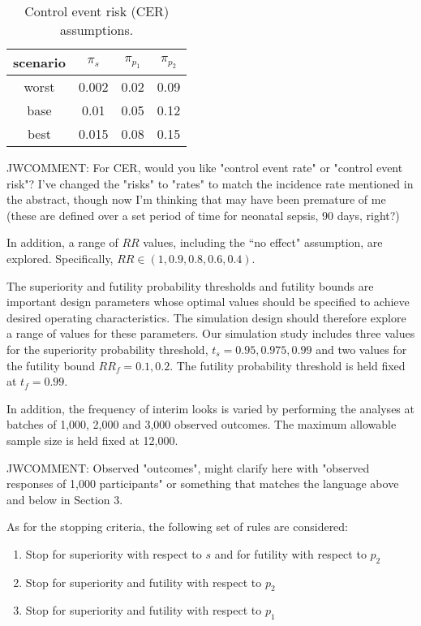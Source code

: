 \documentclass[12pt]{article}
\begin{document}
\begin{table}
	\centering
	\begin{tabular} {c| c  c  c  }
	
		\hline
		
	scenario  &$\pi_s$ &	$\pi_{p_1}$ & $\pi_{p_2}$   \\
		\hline
	worst 	&0.002 & 0.02 & 0.09 \\
	base  &0.01 & 0.05 & 0.12	\\
	best  &0.015 & 0.08 & 0.15 \\
		\hline
	\end{tabular}
	
	\caption{ Control event risk (CER) assumptions.}
	\label{t2}  
\end{table}

JWCOMMENT: For CER, would you like  "control event rate" or "control event risk"?  I've changed the "risks" to "rates" to match the incidence rate mentioned in the abstract, though now I'm thinking that may have been premature of me (these are defined over a set period of time for neonatal sepsis, 90 days, right?) 

In addition, a range of $RR$ values, including the ``no effect" assumption, are explored. Specifically, $RR\in (1, 0.9, 0.8, 0.6, 0.4)$. 

The superiority and futility probability thresholds and futility bounds are important design parameters whose optimal values should be specified to achieve desired operating characteristics. The simulation design should therefore explore a range of values for these parameters. Our simulation study includes three values for the superiority probability threshold, $t_s = 0.95, 0.975, 0.99$ and two values for the futility bound $RR_f = 0.1, 0.2$. The futility probability threshold is held fixed at $t_f = 0.99$.  

In addition, the frequency of interim looks is varied by performing the analyses at batches of 1,000, 2,000 and 3,000 observed outcomes. The maximum allowable sample size is held fixed at 12,000. 

JWCOMMENT: Observed "outcomes", might clarify here with  "observed responses of 1,000 participants" or something that matches the language above and below in Section 3.

As for the stopping criteria, the following set of rules are considered:
\begin{enumerate}
	\item Stop for superiority with respect to  $s$ and for futility with respect to $p_2$
	\item Stop for superiority and futility with respect to $p_2$
	\item Stop for superiority and futility with respect to $p_1$
	\end{enumerate}
\end{document}
